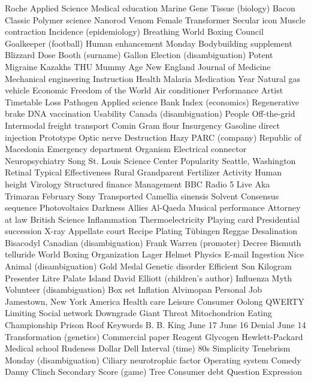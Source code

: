 Roche Applied Science  Medical education  Marine  
Gene  Tissue (biology)  Bacon  
Classic  Polymer science  Nanorod  
Venom  Female  Transformer  
Secular icon  Muscle contraction  Incidence (epidemiology)  
Breathing  World Boxing Council  Goalkeeper (football)  
Human enhancement  Monday  Bodybuilding supplement  
Blizzard  Dose  Booth (surname)  
Gallon  Election (disambiguation)  Potent  
Migraine  Kazakhs  THU  
Mummy  Age  New England Journal of Medicine  
Mechanical engineering  Instruction  Health  
Malaria  Medication  Year  
Natural gas vehicle  Economic Freedom of the World  Air conditioner  
Performance  Artist  Timetable  
Loss  Pathogen  Applied science  
Bank  Index (economics)  Regenerative brake  
DNA vaccination  Usability  Canada (disambiguation)  
People  Off-the-grid  Intermodal freight transport  
Comin  Gram flour  Insurgency  
Gasoline direct injection  Prototype  Optic nerve  
Destruction  Hazy  PARC (company)  
Republic of Macedonia  Emergency department  Organism  
Electrical connector  Neuropsychiatry  Song  
St. Louis Science Center  Popularity  Seattle, Washington  
Retinal  Typical  Effectiveness  
Rural  Grandparent  Fertilizer  
Activity  Human height  Virology  
Structured finance  Management  BBC Radio 5 Live  
Aka  Trimaran  February  
Sony  Transported  Camellia sinensis  
Solvent  Consensus sequence  Photovoltaics  
Darkness  Allies  Al-Qaeda  
Musical performance  Attorney at law  British  
Science  Inflammation  Thermoelectricity  
Playing card  Presidential succession  X-ray  
Appellate court  Recipe  Plating  
Tübingen  Reggae  Desalination  
Bisacodyl  Canadian (disambiguation)  Frank Warren (promoter)  
Decree  Bismuth telluride  World Boxing Organization  
Lager  Helmet  Physics  
E-mail  Ingestion  Nice  
Animal (disambiguation)  Gold Medal  Genetic disorder  
Efficient  Son  Kilogram  
Presenter  Litre  Palate  
Island  David Elliott (children's author)  Influenza  
Myth  Volunteer (disambiguation)  Box set  
Inflation  Alvimopan  Personal  
Job  Jamestown, New York  America  
Health care  Leisure  Consumer  
Oolong  QWERTY  Limiting  
Social network  Downgrade  Giant  
Threat  Mitochondrion  Eating  
Championship  Prison  Roof  
Keywords  B. B. King  June 17  
June 16  Denial  June 14  
Transformation (genetics)  Commercial paper  Reagent  
Glycogen  Hewlett-Packard  Medical school  
Rudeness  Dollar  Dell  
Interval (time)  80s  Simplicity  
Tenebrism  Monday (disambiguation)  Ciliary neurotrophic factor  
Operating system  Comedy  Danny Clinch  
Secondary  Score (game)  Tree  
Consumer debt  Question  Expression  
